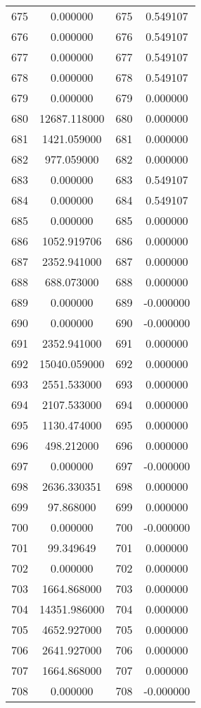 \documentclass[12pt]{article}
\begin{document}
\begin{longtable}{@{}cccc@{}}
675 & 0.000000 & 675 & 0.549107 \\
676 & 0.000000 & 676 & 0.549107 \\
677 & 0.000000 & 677 & 0.549107 \\
678 & 0.000000 & 678 & 0.549107 \\
679 & 0.000000 & 679 & 0.000000 \\
680 & 12687.118000 & 680 & 0.000000 \\
681 & 1421.059000 & 681 & 0.000000 \\
682 & 977.059000 & 682 & 0.000000 \\
683 & 0.000000 & 683 & 0.549107 \\
684 & 0.000000 & 684 & 0.549107 \\
685 & 0.000000 & 685 & 0.000000 \\
686 & 1052.919706 & 686 & 0.000000 \\
687 & 2352.941000 & 687 & 0.000000 \\
688 & 688.073000 & 688 & 0.000000 \\
689 & 0.000000 & 689 & -0.000000 \\
690 & 0.000000 & 690 & -0.000000 \\
691 & 2352.941000 & 691 & 0.000000 \\
692 & 15040.059000 & 692 & 0.000000 \\
693 & 2551.533000 & 693 & 0.000000 \\
694 & 2107.533000 & 694 & 0.000000 \\
695 & 1130.474000 & 695 & 0.000000 \\
696 & 498.212000 & 696 & 0.000000 \\
697 & 0.000000 & 697 & -0.000000 \\
698 & 2636.330351 & 698 & 0.000000 \\
699 & 97.868000 & 699 & 0.000000 \\
700 & 0.000000 & 700 & -0.000000 \\
701 & 99.349649 & 701 & 0.000000 \\
702 & 0.000000 & 702 & 0.000000 \\
703 & 1664.868000 & 703 & 0.000000 \\
704 & 14351.986000 & 704 & 0.000000 \\
705 & 4652.927000 & 705 & 0.000000 \\
706 & 2641.927000 & 706 & 0.000000 \\
707 & 1664.868000 & 707 & 0.000000 \\
708 & 0.000000 & 708 & -0.000000 \\

\end{longtable}
\end{document}
